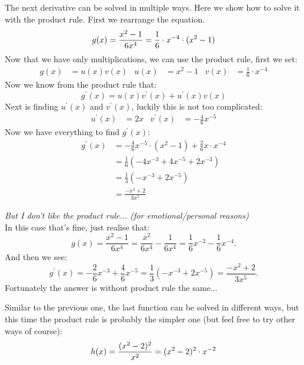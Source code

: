 \documentclass[a4paper]{report}
\begin{document}
\begin{Answer}[ref=ex1]
\noindent The next derivative can be solved in multiple ways. Here we show how to solve it with the product rule. First we rearrange the equation.
\begin{equation*}
g(x) = \frac{x^2-1}{6x^4} =  \frac{1}{6} \cdot x^{-4} \cdot (x^2-1) \\
\end{equation*}
Now that we have only multiplications, we can use the product rule, first we set:
\begin{align*}
g(x)&=u(x)v(x) & u(x)&= x^2-1 & v(x)&= \frac{1}{6}\cdot x^{-4}
\end{align*}
Now we know from the product rule that:
\begin{equation*}
g^\prime(x) = u(x)v^\prime(x) + u^\prime(x)v(x)
\end{equation*}
Next is finding $u^\prime(x)$ and $v^\prime(x)$, luckily this is not too complicated:
\begin{align*}
u^\prime(x) &= 2x & v^\prime(x) &= -\frac{4}{6}x^{-5}
\end{align*}
Now we have everything to find $g^\prime(x)$:
\begin{align*}
g^\prime(x) & = -\frac{4}{6} x^{-5} \cdot (x^2-1) + \frac{2}{6} x \cdot x^{-4} \\
& = \frac{1}{6} (-4x^{-3} +4x^{-5} +2x^{-3}) \\
& = \frac{1}{3} (-x^{-3} +2x^{-5}) \\
& = \frac{-x^2+2}{3x^5}
\end{align*}
\begin{mdframed}
\textit{But I don't like the product rule... (for emotional/personal reasons)}\\
In this case that's fine, just realise that:
\begin{equation*}
g(x) = \frac{x^2-1}{6x^4} = \frac{x^2}{6x^4} - \frac{1}{6x^4} = \frac{1}{6} x^{-2} - \frac{1}{6}x^{-4}.
\end{equation*}
And then we see:
\begin{equation*}
g^\prime(x) = -\frac{2}{6}x^{-3} + \frac{4}{6} x^{-5} = \frac{1}{3} (-x^{-3} + 2x^{-5}) = \frac{-x^2+2}{3x^5}.
\end{equation*}
Fortunately the answer is without product rule the same...
\end{mdframed}
Similar to the previous one, the last function can be solved in different ways, but this time the product rule is probably the simpler one (but feel free to try other ways of course):
\begin{equation*}
h(x) = \frac{(x^2-2)^2}{x^2} = (x^2-2)^2 \cdot x^{-2} \\

\end{equation*}
\end{Answer}
\end{document}

